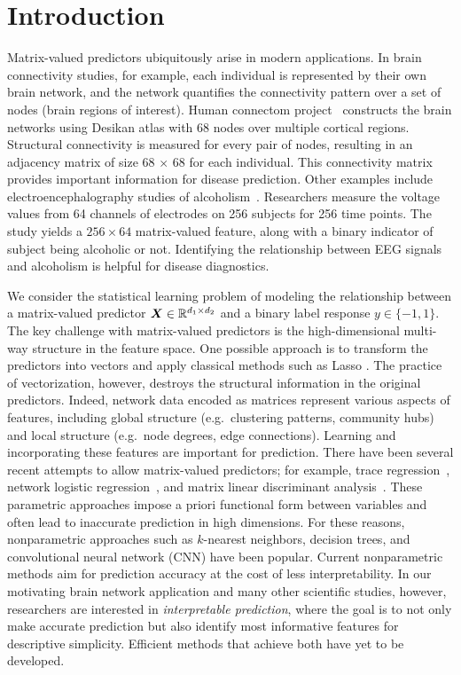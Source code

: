 \documentclass[11pt]{article}
\theoremstyle{definition}
\begin{document}
\vspace{-.3cm}
\section{Introduction }
\vspace{-.5cm}

Matrix-valued predictors ubiquitously arise in modern applications. In brain connectivity studies, for example, each individual is represented by their own brain network, and the network quantifies the connectivity pattern over a set of nodes (brain regions of interest). Human connectom project~\citep{wang2019common} constructs the brain networks using Desikan atlas with 68 nodes over multiple cortical regions. Structural connectivity is measured for every pair of nodes, resulting in an adjacency matrix of size 68 $\times$ 68 for each individual. This connectivity matrix provides important information for disease prediction. Other examples include electroencephalography studies of alcoholism~\citep{zhou2014regularized}. Researchers measure the voltage values from 64 channels of electrodes on 256 subjects for 256 time points. The study yields a $256 \times 64$ matrix-valued feature, along with a binary indicator of subject being alcoholic or not. Identifying the relationship between EEG signals and alcoholism is helpful for disease diagnostics. 


We consider the statistical learning problem of modeling the relationship between a matrix-valued predictor $\bm X \in \mathbb{R}^{d_1\times d_2}$ and a binary label response $y\in\{-1,1\}$.  The key challenge with matrix-valued predictors is the high-dimensional multi-way structure in the feature space. One possible approach is to transform the predictors into vectors and apply classical methods such as Lasso \citep{friedman2010regularization}. The practice of vectorization, however, destroys the structural information in the original predictors. Indeed, network data encoded as matrices represent various aspects of features, including global structure (e.g.\ clustering patterns, community hubs) and local structure (e.g.\ node degrees, edge connections). Learning and incorporating these features are important for prediction. There have been several recent attempts to allow matrix-valued predictors; for example, trace regression~\citep{fan2019generalized}, network logistic regression~\citep{relion2019network}, and matrix linear discriminant analysis~\citep{hu2020matrix}. These parametric approaches impose a priori functional form between variables and often lead to inaccurate prediction in high dimensions. For these reasons, nonparametric approaches such as $k$-nearest neighbors, decision trees, and convolutional neural network (CNN) have been popular. Current nonparametric methods aim for prediction accuracy at the cost of less interpretability. In our motivating brain network application and many other scientific studies, however, researchers are interested in {\it interpretable prediction}, where the goal is to not only make accurate prediction but also identify most informative features for descriptive simplicity. Efficient methods that achieve both have yet to be developed. 
 
\end{document}
